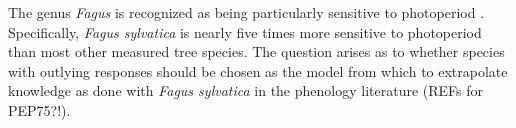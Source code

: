 \documentclass{article}\usepackage[]{graphicx}\usepackage[]{color}
\begin{document}
The genus \emph{Fagus} is recognized as being particularly sensitive to photoperiod \citep{fu2019}. Specifically, \emph{Fagus sylvatica} is nearly five times more sensitive to photoperiod than most other measured tree species. The question arises as to whether species with outlying responses should be chosen as the model from which to extrapolate knowledge as done with \emph{Fagus sylvatica} in the phenology literature (REFs for PEP75?!). \\%









\end{document}
